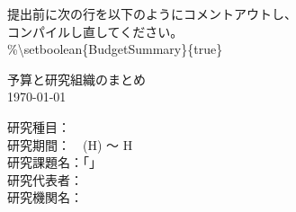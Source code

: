 \begingroup
	\vspace*{30mm}
	\LARGE
	提出前に次の行を以下のようにコメントアウトし、\\
	コンパイルし直してください。\\
	\hspace{2cm}\%\textbackslash setboolean\{BudgetSummary\}\{true\}\\
	\begin{center}
		\LARGE 予算と研究組織のまとめ \\
		\Large \today
	\end{center}
	\vspace{10mm}

	\noindent
	研究種目：　\\
	研究期間：　(H) 〜 H\\
	研究課題名：「 」\\
	研究代表者：\\
	研究機関名：\\
\endgroup
\clearpage

